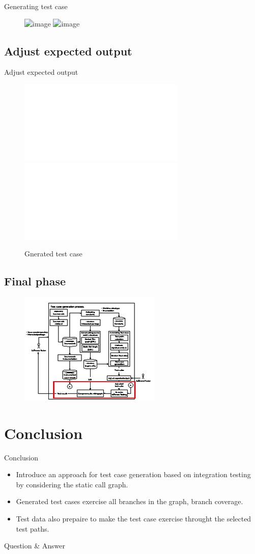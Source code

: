 \documentclass{beamer}
\begin{document}
\begin{frame}{Generating test case}
    \begin{figure}
        \includegraphics<1>[height=0.8\paperheight]{figure/Methodology}
        \includegraphics<2>[height=0.8\paperheight]{figure/Methodology-Highlight-1}
    \end{figure}
\end{frame}

\subsection{Adjust expected output}
\begin{frame}{Adjust expected output}
    \begin{figure}
        \includegraphics<1>[width=.8\paperwidth]{figure/example-of-generated-test-case.pdf}
        \includegraphics<2>[width=.8\paperwidth]{figure/adjusted-example-of-generated-test-case.pdf}
        \caption{Gnerated test case}
        \label{fig:classStructure}
    \end{figure}
\end{frame}

\subsection{Final phase}
\begin{frame}
    \begin{figure}
        \includegraphics[height=0.8\paperheight]{figure/Methodology-Highlight-2}
    \end{figure}
\end{frame}

%
\section{Conclusion}
\begin{frame}{Conclusion}
    \begin{itemize}
        \item<1->Introduce an approach for test case generation based on integration testing by considering the static call graph.
        \item<2->Generated test cases exercise all branches in the graph, branch coverage.
        \item<3->Test data also prepaire to make the test case exercise throught the selected test paths.
    \end{itemize}
\end{frame}

%
\begin{frame}
    \Large{Question \& Answer}
\end{frame}
\end{document}
